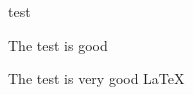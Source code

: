 \documentclass{article}
\begin{document}
test

The test is good



The test is very good
\LaTeX
\end{document}
